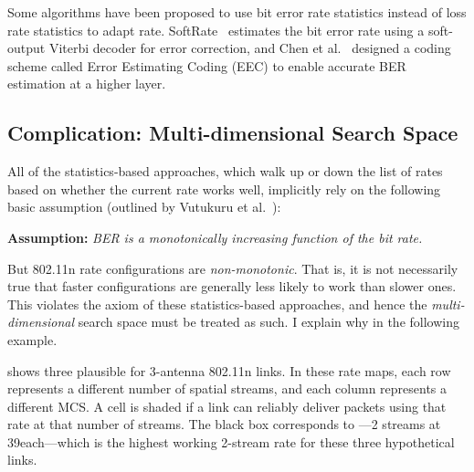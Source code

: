 Some algorithms have been proposed to use bit error rate statistics instead of loss rate statistics to adapt rate. SoftRate~\cite{Vutukuru_SoftRate} estimates the bit error rate using a soft-output Viterbi decoder for error correction, and Chen et al.~\cite{Chen_EEC} designed a coding scheme called Error Estimating Coding (EEC) to enable accurate BER estimation at a higher layer.

\subsection{Complication: Multi-dimensional Search Space} 
All of the statistics-based approaches, which walk up or down the list of rates based on whether the current rate works well, implicitly rely on the following basic assumption (outlined by Vutukuru et al.~\cite{Vutukuru_SoftRate}):
\begin{center}
\textbf{Assumption:} \emph{BER is a monotonically increasing function of the bit rate.}
\end{center}
But 802.11n rate configurations are \emph{non-monotonic}. That is, it is not necessarily true that faster configurations are generally less likely to work than slower ones. This violates the axiom of these statistics-based approaches, and hence the \emph{multi-dimensional} search space must be treated as such. I explain why in the following example.

 shows three plausible  for 3-antenna 802.11n links. In these rate maps, each row represents a different number of spatial streams, and each column represents a different MCS. A cell is shaded if a link can reliably deliver packets using that rate at that number of streams. The black box corresponds to ---2 streams at 39\Mbps each---which is the highest working 2-stream rate for these three hypothetical links.

